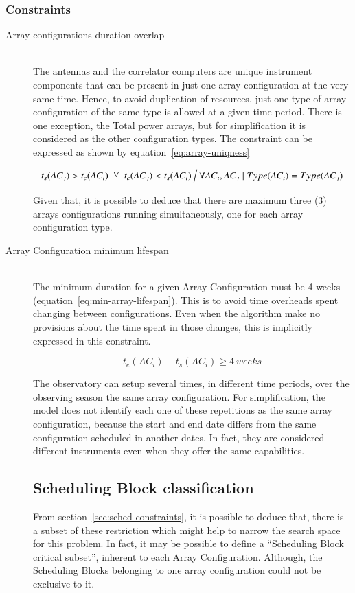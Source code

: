 \subsubsection{Constraints}
\begin{description}
\item[Array configurations duration overlap] \hfill \\
The antennas and the correlator computers are unique instrument components that can be present in just one array configuration at the very same time. Hence, to avoid duplication of resources, just one type of array configuration of the same type is allowed at a given time period. There is one exception, the Total power arrays, but for simplification it is considered as the other configuration types. The constraint can be expressed as shown by equation~\ref{eq:array-uniqness}

\begin{equation}
\label{eq:array-uniqness}
t_s(AC_j) > t_e(AC_i)\; \veebar \; t_e(AC_j) < t_s(AC_i) \:
\Big\slash \: \forall AC_i, AC_j \mid Type(AC_i) = Type(AC_j)
\end{equation}

Given that, it is possible to deduce that there are maximum three (3) arrays configurations running simultaneously, one for each array configuration type.

\item[Array Configuration minimum lifespan] \hfill \\
The minimum duration for a given Array Configuration must be 4 weeks (equation~\ref{eq:min-array-lifespan}). This is to avoid time overheads spent changing between configurations. Even when the algorithm make no provisions about the time spent in those changes, this is implicitly expressed in this constraint.

\begin{equation}
\label{eq:min-array-lifespan}
t_e(AC_i) - t_s(AC_i) \geq 4\:weeks
\end{equation}

The observatory can setup several times, in different time periods, over the observing season the same array configuration. For simplification, the model does not identify each one of these repetitions as the same array configuration, because the start and end date differs from the same configuration scheduled in another dates. In fact, they are considered different instruments even when they offer the same capabilities.

\subsection{Scheduling Block classification}
From section~\ref{sec:sched-constraints}, it is possible to deduce that, there is a subset of these restriction which might help to narrow the search space for this problem. In fact, it may be possible to define a ``Scheduling Block critical subset'', inherent to each Array Configuration. Although, the Scheduling Blocks belonging to one array configuration could not be exclusive to it.


\end{description}
